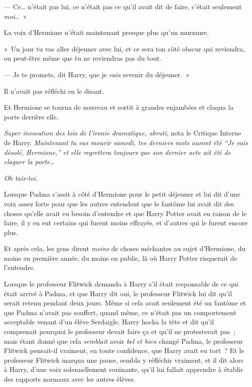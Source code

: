 --- Ce… n'était pas lui, ce n'était pas ce qu'il avait dit de faire, c'était seulement \emph{moi}…~»

La voix d'Hermione n'était maintenant presque plus qu'un murmure.

«~Un jour tu vas aller déjeuner avec lui, et ce sera ton côté obscur qui reviendra, ou peut-être même que tu ne reviendras pas du tout.

--- Je te promets, dit Harry, que je \emph{vais} revenir du déjeuner.~»

Il n'avait pas réfléchi en le disant.

Et Hermione se tourna de nouveau et sortit à grandes enjambées et claqua la porte derrière elle.

\emph{Super invocation des lois de l'ironie dramatique, abruti}, nota le Critique Interne de Harry. \emph{Maintenant tu vas mourir samedi, tes derniers mots auront été “Je suis désolé, Hermione,” et elle regrettera toujours que son dernier acte ait été de claquer la porte…}

\emph{Oh tais-toi.}

\later

Lorsque Padma s'assit à côté d'Hermione pour le petit déjeuner et lui dit d'une voix assez forte pour que les autres entendent que le fantôme lui avait dit des choses qu'elle avait eu besoin d'entendre et que Harry Potter avait eu raison de le faire, il y en eut certains qui furent moins effrayés, et d'autres qui le furent encore plus.

Et après cela, les gens dirent \emph{moins} de choses méchantes au sujet d'Hermione, du moins en première année, du moins en public, là où Harry Potter risquerait de l'entendre.

Lorsque le professeur Flitwick demanda à Harry s'il était responsable de ce qui était arrivé à Padma, et que Harry dit oui, le professeur Flitwick lui dit qu'il serait retenu pendant deux jours. Même si cela avait seulement été un fantôme et que Padma n'avait pas souffert, quand même, ce n'était pas un comportement acceptable venant d'un élève Serdaigle. Harry hocha la tête et dit qu'il comprenait pourquoi le professeur devait faire ça et qu'il ne protesterait pas~; mais étant donné que cela \emph{semblait} avoir \emph{bel et bien} changé Padma, le professeur Flitwick pensait-il vraiment, en toute confidence, que Harry avait eu tort~? Et le professeur Flitwick marqua une pause, sembla y réfléchir vraiment, et il dit alors à Harry, d'une voix solennellement couinante, qu'il lui fallait apprendre à établir des rapports normaux avec les autres élèves.

